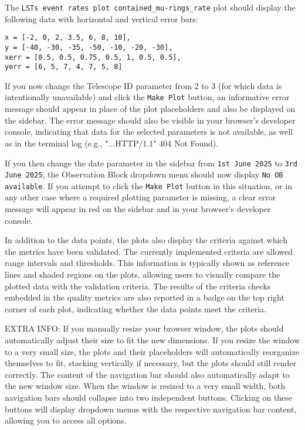 The \texttt{LSTs event rates plot contained\_mu-rings\_rate} plot should display the following data with horizontal and vertical error bars:
\begin{verbatim}
x = [-2, 0, 2, 3.5, 6, 8, 10],
y = [-40, -30, -35, -50, -10, -20, -30],
xerr = [0.5, 0.5, 0.75, 0.5, 1, 0.5, 0.5],
yerr = [6, 5, 7, 4, 7, 5, 8]
\end{verbatim}



If you now change the Telescope ID parameter from 2 to 3 (for which data is intentionally unavailable) and click the \texttt{Make Plot} button, an informative error message should appear in place of the plot placeholders and also be displayed on the sidebar.
The error message should also be visible in your browser's developer console, indicating that data for the selected parameters is not available, as well as in the terminal log (e.g., "$\ldots$HTTP/1.1" 404 Not Found).

If you then change the date parameter in the sidebar from \texttt{1st June 2025} to \texttt{3rd June 2025}, the Observation Block dropdown menu should now display \texttt{No OB available}.
If you attempt to click the \texttt{Make Plot} button in this situation, or in any other case where a required plotting parameter is missing, a clear error message will appear in red on the sidebar and in your browser's developer console.

In addition to the data points, the plots also display the criteria against which the metrics have been validated. The currently implemented criteria are allowed range intervals and thresholds.
This information is typically shown as reference lines and shaded regions on the plots, allowing users to visually compare the plotted data with the validation criteria.
The results of the criteria checks embedded in the quality metrics are also reported in a badge on the top right corner of each plot, indicating whether the data points meet the criteria.

EXTRA INFO: If you manually resize your browser window, the plots should automatically adjust their size to fit the new dimensions.
If you resize the window to a very small size, the plots and their placeholders will automatically reorganize themselves to fit, stacking vertically if necessary, but the plots should still render correctly.
The content of the navigation bar should also automatically adapt to the new window size.
When the window is resized to a very small width, both navigation bars should collapse into two independent buttons. Clicking on these buttons will display dropdown menus with the respective navigation bar content, allowing you to access all options.

